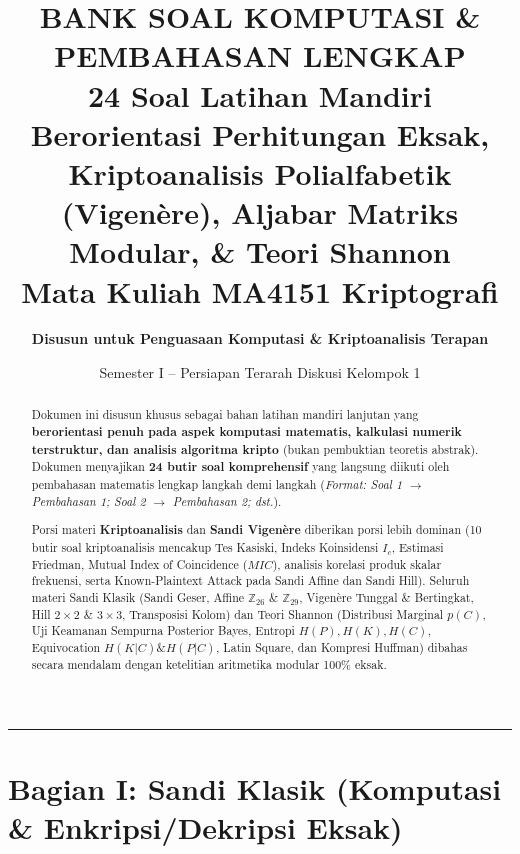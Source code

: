\documentclass[11pt,a4paper]{article}
\title{\vspace{-1.2cm}\textbf{\Large BANK SOAL KOMPUTASI \& PEMBAHASAN LENGKAP}\\\large 24 Soal Latihan Mandiri Berorientasi Perhitungan Eksak, Kriptoanalisis Polialfabetik (Vigenère), Aljabar Matriks Modular, \& Teori Shannon\\\large\textbf{Mata Kuliah MA4151 Kriptografi}}
\author{\textbf{Disusun untuk Penguasaan Komputasi \& Kriptoanalisis Terapan}}
\date{Semester I -- Persiapan Terarah Diskusi Kelompok 1}
\begin{document}
\maketitle
\vspace{-0.5cm}

\begin{abstract}
Dokumen ini disusun khusus sebagai bahan latihan mandiri lanjutan yang \textbf{berorientasi penuh pada aspek komputasi matematis, kalkulasi numerik terstruktur, dan analisis algoritma kripto} (bukan pembuktian teoretis abstrak). Dokumen menyajikan \textbf{24 butir soal komprehensif} yang langsung diikuti oleh pembahasan matematis lengkap langkah demi langkah (\textit{Format: Soal 1 $\to$ Pembahasan 1; Soal 2 $\to$ Pembahasan 2; dst.}). 

Porsi materi \textbf{Kriptoanalisis} dan \textbf{Sandi Vigenère} diberikan porsi lebih dominan (10 butir soal kriptoanalisis mencakup Tes Kasiski, Indeks Koinsidensi $I_c$, Estimasi Friedman, Mutual Index of Coincidence ($MIC$), analisis korelasi produk skalar frekuensi, serta Known-Plaintext Attack pada Sandi Affine dan Sandi Hill). Seluruh materi Sandi Klasik (Sandi Geser, Affine $\mathbb{Z}_{26}$ \& $\mathbb{Z}_{29}$, Vigenère Tunggal \& Bertingkat, Hill $2\times 2$ \& $3\times 3$, Transposisi Kolom) dan Teori Shannon (Distribusi Marginal $p(C)$, Uji Keamanan Sempurna Posterior Bayes, Entropi $H(P), H(K), H(C)$, Equivocation $H(K|C) \& H(P|C)$, Latin Square, dan Kompresi Huffman) dibahas secara mendalam dengan ketelitian aritmetika modular 100\% eksak.
\end{abstract}

\vspace{0.2cm}
\hrule
\vspace{0.3cm}

\tableofcontents
\newpage

\section{Bagian I: Sandi Klasik (Komputasi \& Enkripsi/Dekripsi Eksak)}
\end{document}
